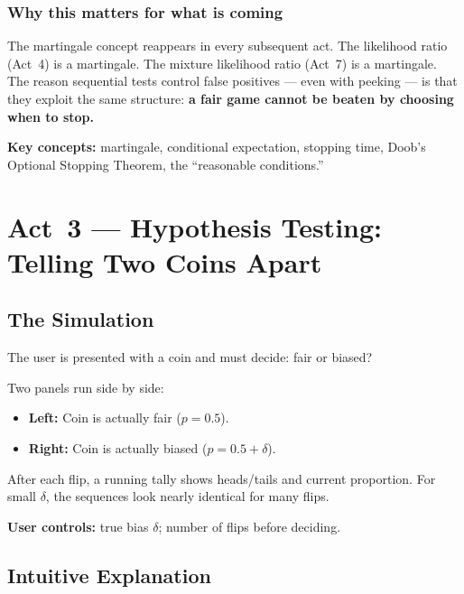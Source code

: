 \documentclass[12pt, a4paper]{article}
\begin{document}
\subsubsection*{Why this matters for what is coming}

The martingale concept reappears in every subsequent act.  The likelihood
ratio (Act~4) is a martingale.  The mixture likelihood ratio (Act~7) is a
martingale.  The reason sequential tests control false positives --- even
with peeking --- is that they exploit the same structure: \textbf{a fair game
cannot be beaten by choosing when to stop.}

\begin{keytakeaway}
\textbf{Key concepts:} martingale, conditional expectation, stopping time,
Doob's Optional Stopping Theorem, the ``reasonable conditions.''
\end{keytakeaway}


\newpage
\section{Act~3 --- Hypothesis Testing: Telling Two Coins Apart}

\subsection{The Simulation}

\begin{simulation}
The user is presented with a coin and must decide: fair or biased?

Two panels run side by side:
\begin{itemize}[nosep]
  \item \textbf{Left:} Coin is actually fair ($p=0.5$).
  \item \textbf{Right:} Coin is actually biased ($p=0.5+\delta$).
\end{itemize}
After each flip, a running tally shows heads/tails and current proportion.
For small $\delta$, the sequences look nearly identical for many flips.

\textbf{User controls:} true bias $\delta$; number of flips before deciding.
\end{simulation}

\subsection{Intuitive Explanation}
\end{document}
